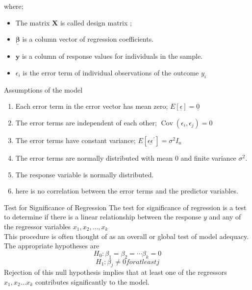 \documentclass{beamer}
\numberwithin{equation}{section}
\numberwithin{table}{section}
\begin{document}
\begin{frame}
where;\\
\begin{itemize}
	\item The matrix $\mathbf{X}$ is called design matrix ;\\

\vspace{0.3cm}
\item  $\underline{\boldsymbol{\beta}}$ is a column vector of regression coefficients.\\
\vspace{0.3cm}
\item  $\mathbf{y}$ is a column of response values for individuals in the sample.\\

\vspace{0.3cm}
\item $\epsilon_i$ is the error term of individual observations of the outcome $y_i$ 
\end{itemize}
\end{frame}

\begin{frame}
\begin{block}{Assumptions of the model}
\vspace{0.2cm}
\begin{enumerate}
\item Each error term in the error vector has mean zero; $E[\underline{\epsilon}]=\underline{0}$
\vspace{0.2cm}
\item The error terms are independent of each other; $\operatorname{Cov}\left(\epsilon_i, \epsilon_j\right)=0$
\vspace{0.3cm}
\item The error terms have constant variance; $E\left[\underline{\epsilon \epsilon}{ }^{\prime}\right]=\sigma^2 I_n$
\vspace{0.3cm}
\item  The error terms are normally distributed with mean 0 and finite variance $\sigma^2$.
\vspace{0.3cm}
\item The response variable is normally distributed.
\vspace{0.3cm}
\item here is no correlation between the error terms and the predictor variables.
\end{enumerate}
\end{block}
\end{frame}
\begin{frame}{Test for Significance of Regression}
The test for significance of regression is a test to determine if there
is a linear relationship between the response $y$ and any of the
regressor variables $x_1, x_2, \ldots ,x_k$\\
This procedure is often thought of as an overall or global test of model adequacy. The appropriate hypotheses are\\
$$H_0:\beta_1=\beta_2=\cdots\beta_k=0$$
$$H_1:\beta_j\neq 0 for at least j$$
Rejection of this null hypothesis implies that at least one of the
regressors $x_1, x_2 \ldots x_k$ contributes significantly to the model.
\end{frame}
\end{document}
